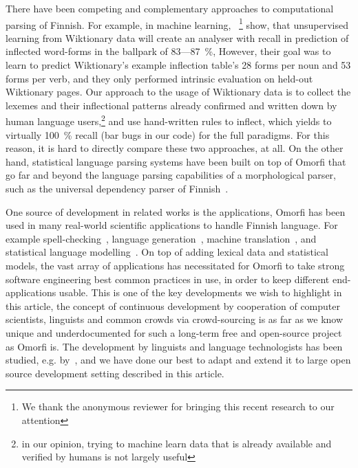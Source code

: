 \documentclass[a4paper,12pt]{article}
\begin{document}
There have been competing and complementary approaches to computational
parsing of Finnish. For example, in machine learning,
~\citet{durrett2013supervised}\footnote{We thank the anonymous reviewer for
bringing this recent research to our attention} show, that unsupervised
learning from Wiktionary data will create an analyser with recall in
prediction of inflected word-forms in the ballpark of 83---87~\%, However,
their goal was to learn to predict Wiktionary's example inflection table's
28 forms per noun and 53 forms per verb, and they only performed intrinsic
evaluation on held-out Wiktionary pages. Our approach to the usage of Wiktionary
data is to collect the lexemes and their inflectional patterns already
confirmed and written down by human language users,\footnote{in our opinion,
trying to machine learn data that is already available and verified by
humans is not largely useful} and use hand-written rules to inflect, which
yields to virtually 100~\% recall (bar bugs in our code) for the full
paradigms. For this reason, it is hard to directly compare these two
approaches, at all. On the other hand, statistical language parsing systems
have been built on top of Omorfi that go far and beyond the language parsing
capabilities of a morphological parser, such as the universal dependency
parser of Finnish~\citep{pyysalo2015universal}.

One source of development in related works is the applications, Omorfi has been
used in many real-world scientific applications to handle Finnish language.
For example spell-checking~\citep{pirinen2014weighted}, language
generation~\citep{toivanen2012corpus}, machine
translation~\citep{clifton2011combining,rubino2015abumatran}, and statistical
language modelling~\citep{haverinen2013building,bohnet2013joint}.  On top of
adding lexical data and statistical models, the vast array of applications has
necessitated for Omorfi to take strong software engineering best common
practices in use, in order to keep different end-applications usable. This is
one of the key developments we wish to highlight in this article, the concept
of continuous development by cooperation of computer scientists, linguists and
common crowds via crowd-sourcing is as far as we know unique and
underdocumented for such a long-term free and open-source project as Omorfi is.
The development by linguists and language technologists has been studied, e.g.
by~\citet{maxwell2008joint}, and we have done our best to adapt and extend it
to large open source development setting described in this article.
\end{document}
